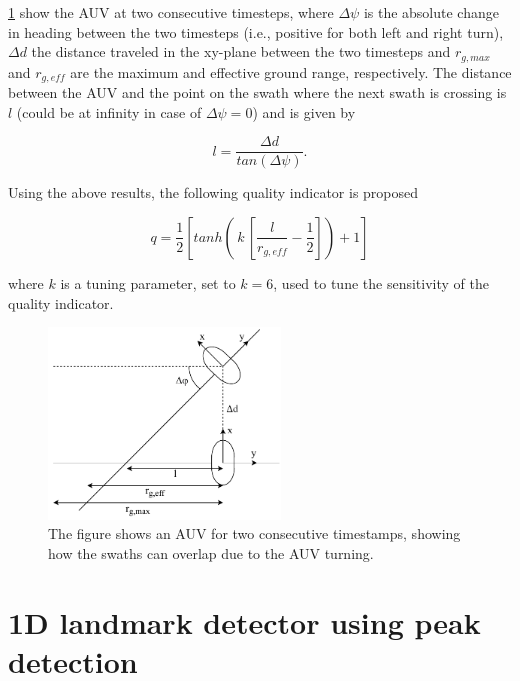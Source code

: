 \cref{fig:quality_ind} show the AUV at two consecutive timesteps, where $\Delta \psi$ is the absolute change in heading between the two timesteps (i.e., positive for both left and right turn), $\Delta d$ the distance traveled in the xy-plane between the two timesteps and $r_{g, max}$ and $r_{g, eff}$ are the maximum and effective ground range, respectively. The distance between the AUV and the point on the swath where the next swath is crossing is $l$ (could be at infinity in case of $\Delta \psi = 0$) and is given by

\begin{equation}
    l = \frac{\Delta d}{tan(\Delta \psi)}.
    \label{eq:l_qi}
\end{equation}

Using the above results, the following quality indicator is proposed

\begin{equation}
    q = \frac{1}{2}[tanh( \,k\, [\frac{l}{r_{g, eff}} - \frac{1}{2}]) + 1]
\end{equation}

where $k$ is a tuning parameter, set to $k = 6$, used to tune the sensitivity of the quality indicator. 

\begin{figure}
    \centering
    \includegraphics[width=0.55\textwidth]{figures/quality_ind.drawio.pdf}
    \caption{The figure shows an AUV for two consecutive timestamps, showing how the swaths can overlap due to the AUV turning.}
    \label{fig:quality_ind}
\end{figure}

\section{1D landmark detector using peak detection}

